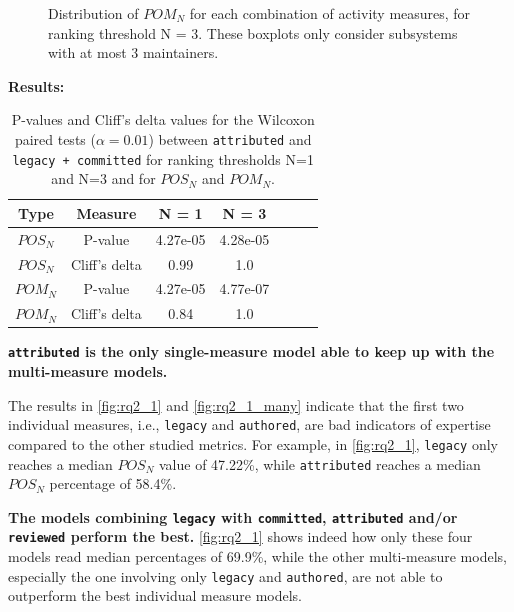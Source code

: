 \begin{figure}[t]
\begin{minipage}[b]{\columnwidth}
    \caption{Distribution of $POM_N$ for each combination of activity measures, for ranking threshold N = 3. These boxplots only consider subsystems with at most 3 maintainers.}
    \label{fig:rq2_3_many}
  \end{minipage}
\end{figure}



{\bf Results:}

\begin{table}[t]
\centering
 \begin{tabular}{c c c c c c c} 
 Type & Measure & N = 1 & N = 3 \\
 \hline
  $POS_N$ & P-value       & 4.27e-05 &  4.28e-05  \\
  $POS_N$ & Cliff's delta & 0.99    & 1.0     \\
  $POM_N$ & P-value       & 4.27e-05 & 4.77e-07  \\
  $POM_N$ & Cliff's delta & 0.84    & 1.0     \\
\end{tabular}
\caption{P-values and Cliff's delta values for the Wilcoxon paired tests ($\alpha=0.01$) between \texttt{attributed} and \texttt{legacy + committed} for ranking thresholds N=1 and N=3 and for $POS_N$ and $POM_N$.}
\label{table:rq2_wilc_att_loc_cc}
\end{table}


\textbf{\texttt{attributed} is the only single-measure model able to keep up with the multi-measure models.} 

The results in \autoref{fig:rq2_1} and \autoref{fig:rq2_1_many} indicate that the first two individual measures, i.e., \texttt{legacy} and \texttt{authored}, are bad indicators of expertise compared to the other studied metrics. For example, in \autoref{fig:rq2_1}, \texttt{legacy} only reaches a median $POS_N$ value of 47.22\%, while \texttt{attributed} reaches a median $POS_N$ percentage of 58.4\%.

\textbf{The models combining \texttt{legacy} with \texttt{committed}, \texttt{attributed} and/or \texttt{reviewed} perform the best.} \autoref{fig:rq2_1} shows indeed how only these four models read median percentages of 69.9\%, while the other multi-measure models, especially the one involving only \texttt{legacy} and \texttt{authored}, are not able to outperform the best individual measure models. %

